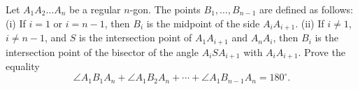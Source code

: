 Let $A_1 A_2 \ldots A_n$ be a regular $n$-gon. The points $B_1, \ldots, B_{n-1}$ are defined as follows:
(i) If $i = 1$ or $i = n-1$, then $B_i$ is the midpoint of the side $A_i A_{i+1}$.
(ii) If $i \neq 1$, $i \neq n-1$, and $S$ is the intersection point of $A_1 A_{i+1}$ and $A_n A_i$, then $B_i$ is the intersection point of the bisector of the angle $A_i S A_{i+1}$ with $A_i A_{i+1}$.
Prove the equality
\[ \angle A_1 B_1 A_n + \angle A_1 B_2 A_n + \cdots + \angle A_1 B_{n-1} A_n = 180^\circ. \]
